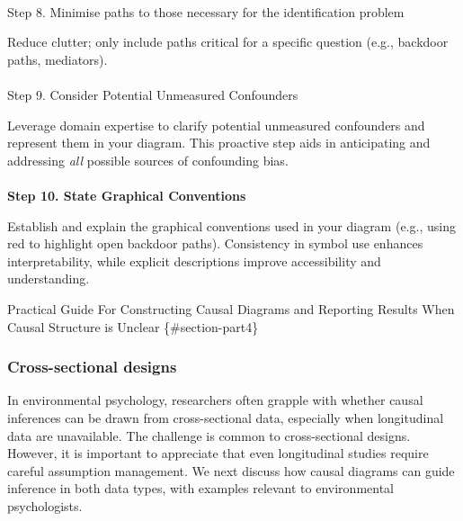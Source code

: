 \documentclass[
  single column]{article}
\makeatletter
\let\oldparagraph\paragraph
\renewcommand{\paragraph}{
    \@ifstar
      \xxxParagraphStar
      \xxxParagraphNoStar
  }
\newcommand{\xxxParagraphStar}[1]{\oldparagraph*{#1}\mbox{}}
\newcommand{\xxxParagraphNoStar}[1]{\oldparagraph{#1}\mbox{}}
\makeatother
\begin{document}
\paragraph{Step 8. Minimise paths to those necessary for the
identification
problem}\label{step-8.-minimise-paths-to-those-necessary-for-the-identification-problem}

Reduce clutter; only include paths critical for a specific question
(e.g., backdoor paths, mediators).

\paragraph{Step 9. Consider Potential Unmeasured
Confounders}\label{step-9.-consider-potential-unmeasured-confounders}

Leverage domain expertise to clarify potential unmeasured confounders
and represent them in your diagram. This proactive step aids in
anticipating and addressing \emph{all} possible sources of confounding
bias.

\paragraph{\texorpdfstring{\textbf{Step 10. State Graphical
Conventions}}{Step 10. State Graphical Conventions}}\label{step-10.-state-graphical-conventions}

Establish and explain the graphical conventions used in your diagram
(e.g., using red to highlight open backdoor paths). Consistency in
symbol use enhances interpretability, while explicit descriptions
improve accessibility and understanding.

Practical Guide For Constructing Causal Diagrams and Reporting Results
When Causal Structure is Unclear \{\#section-part4\}

\subsubsection{Cross-sectional designs}\label{cross-sectional-designs}

In environmental psychology, researchers often grapple with whether
causal inferences can be drawn from cross-sectional data, especially
when longitudinal data are unavailable. The challenge is common to
cross-sectional designs. However, it is important to appreciate that
even longitudinal studies require careful assumption management. We next
discuss how causal diagrams can guide inference in both data types, with
examples relevant to environmental psychologists.
\end{document}
